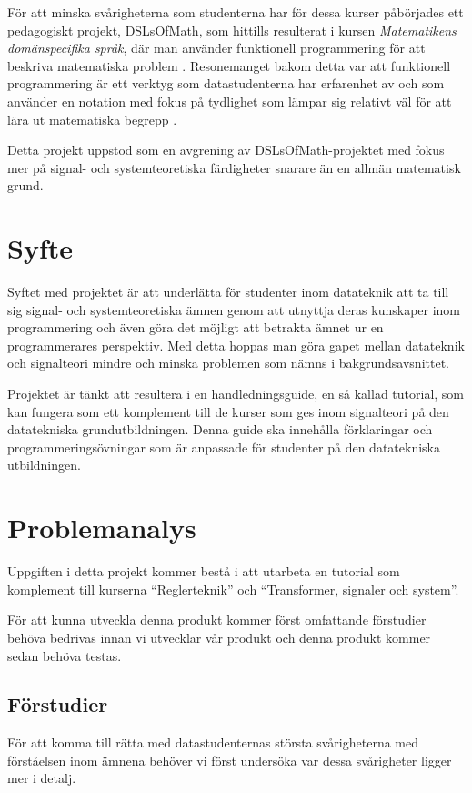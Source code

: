 \documentclass{article}
\begin{document}
För att minska svårigheterna som studenterna har för dessa kurser
påbörjades ett pedagogiskt projekt, DSLsOfMath, som hittills
resulterat i kursen \textit{Matematikens domänspecifika språk}, där man
använder funktionell programmering för att beskriva matematiska problem \cite{kursplan:dslsofmath}.
Resonemanget bakom detta var att funktionell programmering är ett
verktyg som datastudenterna har erfarenhet av och som använder en
notation med fokus på tydlighet som lämpar sig relativt väl för
att lära ut matematiska begrepp \cite{tfpie}.

Detta projekt uppstod som en avgrening av DSLsOfMath-projektet med
fokus mer på signal- och systemteoretiska färdigheter snarare än
en allmän matematisk grund.

\section{Syfte}
Syftet med projektet är att underlätta för studenter inom datateknik
att ta till sig signal- och systemteoretiska ämnen genom att utnyttja
deras kunskaper inom programmering och även göra det möjligt att
betrakta ämnet ur en programmerares perspektiv.
Med detta hoppas man göra gapet mellan datateknik och
signalteori mindre och minska problemen som nämns i
bakgrundsavsnittet.

Projektet är tänkt att resultera i en handledningsguide, en så kallad
tutorial, som kan fungera som ett komplement till de kurser som ges
inom signalteori på den datatekniska grundutbildningen. Denna guide ska innehålla förklaringar och programmeringsövningar som är anpassade för studenter på den datatekniska utbildningen.

\section{Problemanalys}
Uppgiften i detta projekt kommer bestå i att utarbeta en tutorial som
komplement till kurserna “Reglerteknik” och “Transformer, signaler och
system”.

För att kunna utveckla denna produkt kommer först omfattande
förstudier behöva bedrivas innan vi utvecklar vår produkt och denna
produkt kommer sedan behöva testas.

\subsection{Förstudier}
För att komma till rätta med datastudenternas största svårigheterna
med förståelsen inom ämnena behöver vi först undersöka var dessa
svårigheter ligger mer i detalj.
\end{document}
